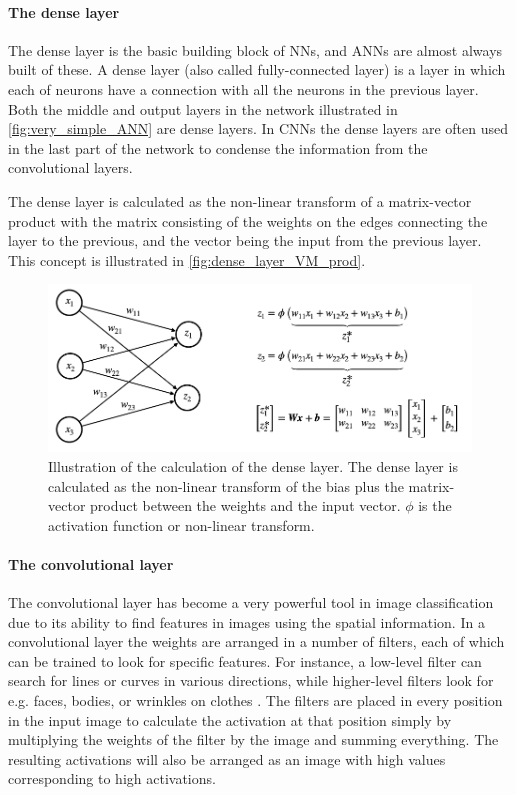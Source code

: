 \paragraph{The dense layer}
The dense layer is the basic building block of NNs, and ANNs are almost always built of these. A dense layer (also called fully-connected layer) is a layer in which each of neurons have a connection with all the neurons in the previous layer. Both the middle and output layers in the network illustrated in \autoref{fig:very_simple_ANN} are dense layers. In CNNs the dense layers are often used in the last part of the network to condense the information from the convolutional layers.

The dense layer is calculated as the non-linear transform of a matrix-vector product with the matrix consisting of the weights on the edges connecting the layer to the previous, and the vector being the input from the previous layer. This concept is illustrated in \autoref{fig:dense_layer_VM_prod}.
\begin{figure}
    \centering
    \captionsetup{width=.95\linewidth}
    \includegraphics[width=\linewidth]{Pics/02_Theory/dense_layer_VM_prod.png}
    \caption{Illustration of the calculation of the dense layer. The dense layer is calculated as the non-linear transform of the bias plus the matrix-vector product between the weights and the input vector. $\phi$ is the activation function or non-linear transform.}
    \label{fig:dense_layer_VM_prod}
\end{figure}

\paragraph{The convolutional layer}
The convolutional layer has become a very powerful tool in image classification due to its ability to find features in images using the spatial information. In a convolutional layer the weights are arranged in a number of filters, each of which can be trained to look for specific features. For instance, a low-level filter can search for lines or curves in various directions, while higher-level filters look for e.g. faces, bodies, or wrinkles on clothes \cite{Yosinski2015}. The filters are placed in every position in the input image to calculate the activation at that position simply by multiplying the weights of the filter by the image and summing everything. The resulting activations will also be arranged as an image with high values corresponding to high activations.

